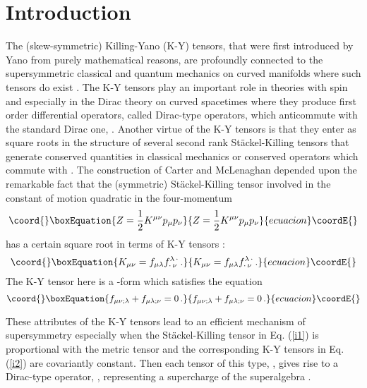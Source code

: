\documentclass[a4paper,12pt]{article}
\begin{document}
\section{Introduction}

The (skew-symmetric) Killing-Yano (K-Y) tensors, that were first introduced 
by Yano \cite{Y} from purely mathematical reasons, are profoundly connected 
to the supersymmetric classical and quantum mechanics on curved manifolds 
where such tensors do exist \cite{GRH}.  The K-Y tensors play an important 
role in theories with spin and especially in the Dirac theory on curved 
spacetimes where they produce first order differential operators, called 
Dirac-type operators, which anticommute with the standard Dirac one, \coordHE{}  
\cite{CML}. Another virtue of the K-Y tensors is that they enter as square 
roots in the structure of several second rank St\" ackel-Killing tensors that 
generate conserved quantities in classical mechanics or conserved operators 
which commute with \coordHE{}. 
The construction of Carter and McLenaghan 
depended upon the remarkable fact that the (symmetric) St\" ackel-Killing 
tensor \coordHE{} involved in the constant of motion quadratic in the 
four-momentum \coordHE{} 
\begin{equation}\coord{}\boxEquation{\label{i1}
Z = {1\over 2} K^{\mu\nu} p_\mu p_\nu
}{Z = {1\over 2} K^{\mu\nu} p_\mu p_\nu
}{ecuacion}\coordE{}\end{equation}
has a certain square root in terms of K-Y tensors \coordHE{} 
\cite{PF}:
\begin{equation}\coord{}\boxEquation{\label{i2}
K_{\mu\nu} = f_{\mu\lambda} f^{\lambda\,\cdot} _{\cdot\,\nu}\,. 
}{K_{\mu\nu} = f_{\mu\lambda} f^{\lambda\,\cdot} _{\cdot\,\nu}\,. 
}{ecuacion}\coordE{}\end{equation}
\noindent The K-Y tensor here is a \coordHE{}-form \coordHE{} 
which satisfies the equation
\begin{equation}\coord{}\boxEquation{\label{i3}
f_{\mu\nu;\lambda}+f_{\mu\lambda;\nu} = 0\,.
}{f_{\mu\nu;\lambda}+f_{\mu\lambda;\nu} = 0\,.
}{ecuacion}\coordE{}\end{equation}

These  attributes of the K-Y tensors lead to an 
efficient mechanism of supersymmetry especially when the 
St\" ackel-Killing tensor \coordHE{} in Eq. (\ref{i1}) is proportional 
with the metric tensor \coordHE{} and the corresponding K-Y tensors 
in Eq. (\ref{i2}) are covariantly constant. Then each tensor of this type, 
\coordHE{}, gives rise to a Dirac-type operator,  \coordHE{},  representing a 
supercharge of the superalgebra \coordHE{}.
\end{document}
